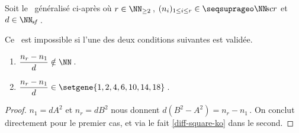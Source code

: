 \begin{fact} \label{sftable-illegal-0-sol}
	Soit le \sftab\ généralisé ci-après où
	$r \in \NN_{\geq 2}$\,,
	$( n_i )_{1 \leq i \leq r} \in \NNseq[r]$
	et
	$d \in \NNsf$\,.

    \begin{center}
    \end{center}

	Ce \sftab\ est impossible si l'une des deux conditions suivantes est validée.
	
	\begin{enumerate}
		\item $\dfrac{n_r - n_1}{d} \notin \NN$\,.

		\item $\dfrac{n_r - n_1}{d} \in \setgene{1, 2, 4, 6, 10, 14, 18}$\,.
	\end{enumerate}
\end{fact}


\begin{proof}
	$n_1 = d A^2$ et $n_r = d B^2$ nous donnent $d (B^2 - A^2) = n_r - n_1$\,. On conclut directement pour le premier cas, et via le fait \ref{diff-square-ko} dans le second.
\end{proof}

